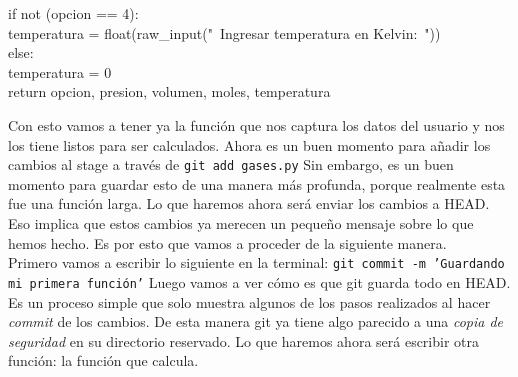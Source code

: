 \documentclass[10pt,letterpaper]{article}
\newcommand{\inlinecode}[1]{
\colorbox{light-gray}{\texttt{#1}}
}
\newenvironment{Code}
{
\begin{lrbox}{\selvestebox}%
\begin{minipage}{\dimexpr\columnwidth-2\fboxsep\relax}
\fontfamily{\ttdefault}\selectfont
}
{\end{minipage}\end{lrbox}%
\begin{center}
\colorbox{light-gray}{\usebox{\selvestebox}}
\end{center}
}
\begin{document}
\begin{Code}
\hspace*{8mm}if not (opcion == 4):\\
\hspace*{16mm}temperatura = float(raw\_input("\ \hspace*{-2mm}Ingresar temperatura en Kelvin:\ "))\\
\hspace*{8mm}else:\\
\hspace*{16mm}temperatura = 0\\
\hspace*{8mm} return opcion, presion, volumen, moles, temperatura
\end{Code}

Con esto vamos a tener ya la funci\'on que nos captura los datos del usuario y nos los tiene listos para ser calculados. Ahora es un buen momento para a\~nadir los cambios al stage a trav\'es de \inlinecode{git add gases.py} Sin embargo, es un buen momento para guardar esto de una manera m\'as profunda, porque realmente esta fue una funci\'on larga. Lo que haremos ahora ser\'a enviar los cambios a HEAD. Eso implica que estos cambios ya merecen un peque\~no mensaje sobre lo que hemos hecho. Es por esto que vamos a proceder de la siguiente manera.\\

Primero vamos a escribir lo siguiente en la terminal: \inlinecode{git commit -m 'Guardando mi primera funci\'on'} Luego vamos a ver c\'omo es que git guarda todo en HEAD. Es un proceso simple que solo muestra algunos de los pasos realizados al hacer \emph{commit} de los cambios. De esta manera git ya tiene algo parecido a una \textit{copia de seguridad} en su directorio reservado. Lo que haremos ahora ser\'a escribir otra funci\'on: la funci\'on que calcula.
\end{document}

